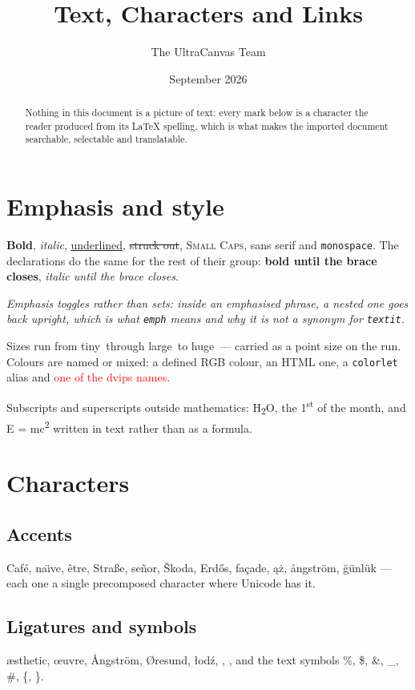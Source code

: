 \documentclass[11pt]{article}
\title{Text, Characters and Links}
\author{The UltraCanvas Team}
\date{September 2026}
\begin{document}
\maketitle

\begin{abstract}
Nothing in this document is a picture of text: every mark below is a
character the reader produced from its LaTeX spelling, which is what makes
the imported document searchable, selectable and translatable.
\end{abstract}

\section{Emphasis and style}
\textbf{Bold}, \textit{italic}, \underline{underlined}, \sout{struck out},
\textsc{Small Caps}, \textsf{sans serif} and \texttt{monospace}. The
declarations do the same for the rest of their group:
{\bfseries bold until the brace closes}, {\itshape italic until the brace
closes}.

\emph{Emphasis toggles rather than sets: inside an emphasised phrase,
\emph{a nested one goes back upright}, which is what \texttt{emph} means
and why it is not a synonym for \texttt{textit}.}

Sizes run from \tiny tiny\normalsize\ through \large large\normalsize\ to
\Huge huge\normalsize\ --- carried as a point size on the run.
Colours are named or mixed: \textcolor{ultrablue}{a defined RGB colour},
\textcolor{warm}{an HTML one}, \textcolor{cool}{a \texttt{colorlet} alias}
and \textcolor{red}{one of the dvips names}.

Subscripts and superscripts outside mathematics:
H\textsubscript{2}O, the 1\textsuperscript{st} of the month, and
E = mc\textsuperscript{2} written in text rather than as a formula.

\section{Characters}
\subsection{Accents}
Caf\'e, na\"{\i}ve, \^etre, Stra\ss e, se\~nor, \v{S}koda, Erd\H{o}s,
fa\c{c}ade, \k{a}\.z, \r{a}ngstr\"om, \u{g}\"unl\"uk --- each one a single
precomposed character where Unicode has it.

\subsection{Ligatures and symbols}
\ae sthetic, \oe uvre, \AA ngstr\"om, \O resund, \l od\'z, \DH, \TH, and the
text symbols \%, \$, \&, \_, \#, \{, \}.
\end{document}
